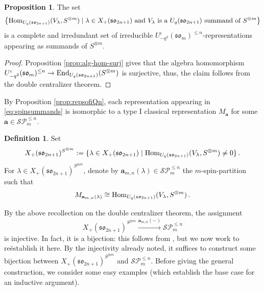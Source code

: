 \documentclass[10pt]{amsart}
\numberwithin{equation}{section}
\theoremstyle{definition}
\newtheorem{prop}[thm]{Proposition}
\newtheorem{defn}[thm]{Definition}
\newcommand{\Hom}{{\rm Hom}}
\newcommand{\End}{{\rm End}}
\newcommand{\son}[1][2n+1]{\mathfrak{so}_{#1}}
\newcommand{\som}[1][m]{\mathfrak{so}_{#1}}
\newcommand{\iqUsom}[1][m]{{U}^{\iota}_{-q^2}(\som[#1])}
\newcommand{\ab}{\mathbf{a}}
\newcommand{\SP}{\mathcal{SP}}
\begin{document}
\begin{prop}\label{prop:u'-doublecantralizer}
The set
\begin{equation}\label{eq:spinsummands}
\left\{\Hom_{U_q(\son)}(V_{\lambda}, S^{\otimes m}) \mid 
\text{$\lambda \in X_+(\son)$ and $V_{\lambda}$ is a $U_q(\son)$ summand of $S^{\otimes m}$}\right\}
\end{equation}
is a complete and irredundant set of irreducible $\iqUsom^{\le n}$-representations appearing 
as summands of $S^{\otimes m}$.
\end{prop}
\begin{proof}
Proposition \ref{prop:alg-hom-surj} gives that the 
algebra homomorphism $\iqUsom^{\le n}\rightarrow \End_{U_q(\son)}(S^{\otimes m})$ is surjective,
thus, the claim follows from the double centralizer theorem.  
\end{proof}

By Proposition \ref{prop:repsofiQn}, each representation appearing in \eqref{eq:spinsummands}
is isomorphic to a type I classical representation $M_{\ab}$ for some $\ab \in \SP_m^{\le n}$.

\begin{defn}\label{defn:2xcentralizer-map-on-weights}
Set
\[
X_+(\son)^{S^{\otimes m}} := \{\lambda\in X_+(\son) \mid \Hom_{U_q(\son)}(V_{\lambda}, S^{\otimes m})\ne 0\} \, .
\] 
For $\lambda \in X_+(\son)^{S^{\otimes m}}$, 
denote by $\ab_{m,n}(\lambda) \in \SP_m^{\le n}$ 
the $m$-spin-partition such that 
\[
M_{\ab_{m,n}(\lambda)} \cong \Hom_{U_q(\son)}(V_{\lambda}, S^{\otimes m})\, .
\]
\end{defn}

By the above recollection on the double centralizer theorem, the assignment 
\begin{equation}\label{eq:ourbijection}
X_+(\son)^{S^{\otimes m}} \xrightarrow{\ab_{m,n}(-)} \SP_m^{\le n} 
\end{equation}
is injective. In fact, it is a bijection: 
this follows from \cite[Proposition 5.5]{Wenzl-Spin}, but we now work to re\"{e}stablish it here. 
By the injectivity already noted, 
it suffices to construct some bijection between $X_+(\son)^{S^{\otimes m}}$ and $\SP_m^{\le n}$.
Before giving the general construction, we consider some easy examples 
(which establish the base case for an inductive argument).
\end{document}
